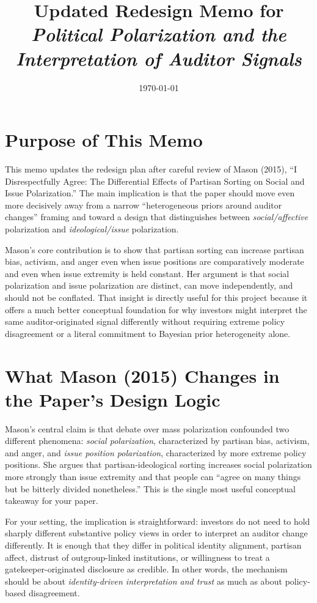 \documentclass[12pt]{article}
\title{Updated Redesign Memo for \textit{Political Polarization and the Interpretation of Auditor Signals}}
\author{}
\date{\today}
\begin{document}
\maketitle

\section{Purpose of This Memo}

This memo updates the redesign plan after careful review of Mason (2015), ``I Disrespectfully Agree: The Differential Effects of Partisan Sorting on Social and Issue Polarization.'' The main implication is that the paper should move even more decisively away from a narrow ``heterogeneous priors around auditor changes'' framing and toward a design that distinguishes between \emph{social/affective} polarization and \emph{ideological/issue} polarization.

Mason's core contribution is to show that partisan sorting can increase partisan bias, activism, and anger even when issue positions are comparatively moderate and even when issue extremity is held constant. Her argument is that social polarization and issue polarization are distinct, can move independently, and should not be conflated. That insight is directly useful for this project because it offers a much better conceptual foundation for why investors might interpret the same auditor-originated signal differently without requiring extreme policy disagreement or a literal commitment to Bayesian prior heterogeneity alone.

\section{What Mason (2015) Changes in the Paper's Design Logic}

Mason's central claim is that debate over mass polarization confounded two different phenomena: \emph{social polarization}, characterized by partisan bias, activism, and anger, and \emph{issue position polarization}, characterized by more extreme policy positions. She argues that partisan-ideological sorting increases social polarization more strongly than issue extremity and that people can ``agree on many things but be bitterly divided nonetheless.'' This is the single most useful conceptual takeaway for your paper.

For your setting, the implication is straightforward: investors do not need to hold sharply different substantive policy views in order to interpret an auditor change differently. It is enough that they differ in political identity alignment, partisan affect, distrust of outgroup-linked institutions, or willingness to treat a gatekeeper-originated disclosure as credible. In other words, the mechanism should be about \emph{identity-driven interpretation and trust} as much as about policy-based disagreement.
\end{document}
